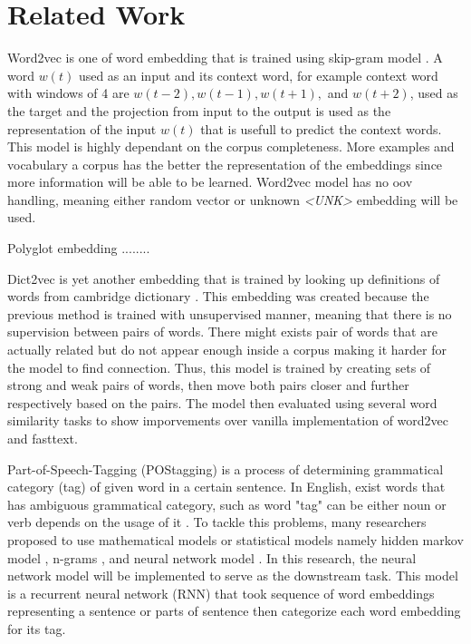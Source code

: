 \chapter{Related Work}
\label{chap:relatedwork}

Word2vec is one of word embedding that is trained using skip-gram
model \citep{Distributed2013mikolov}. A word $w(t)$ used as an input
and its context word, for example context word with windows of 4 are
$w(t-2), w(t-1), w(t+1),$ and $w(t+2)$, used as the target and the
projection from input to the output is used as the representation of
the input $w(t)$ that is usefull to predict the context words. This
model is highly dependant on the corpus completeness. More examples
and vocabulary a corpus has the better the representation of the
embeddings since more information will be able to be learned. Word2vec
model has no oov handling, meaning either random vector or unknown
\textit{\textless UNK\textgreater} embedding will be used.

Polyglot embedding ........

Dict2vec is yet another embedding that is trained by looking up
definitions of words from cambridge dictionary
\citep{tissier2017dict2vec}. This embedding was created because the
previous method is trained with unsupervised manner, meaning that
there is no supervision between pairs of words. There might exists
pair of words that are actually related but do not appear enough
inside a corpus making it harder for the model to find connection.
Thus, this model is trained by creating sets of strong and weak pairs of
words, then move both pairs closer and further respectively based on
the pairs. The model then evaluated using several word similarity
tasks to show imporvements over vanilla implementation of word2vec and
fasttext. 

Part-of-Speech-Tagging (POStagging) is a process of determining
grammatical category (tag) of given word in a certain sentence. In English,
exist words that has ambiguous grammatical category, such as word
"tag" can be either noun or verb depends on the usage of it
\citep{apractical1992cutting}. To tackle this problems, many
researchers proposed to use mathematical models or statistical models
namely hidden markov model \citep{apractical1992cutting}, n-grams
\citep{tnt2000Brants}, and neural network model
\citep{finding2015ling}. In this research, the neural network model
will be implemented to serve as the downstream task. This model is a
recurrent neural network (RNN) that took sequence of word embeddings
representing a sentence or parts of sentence then categorize each word
embedding for its tag.

